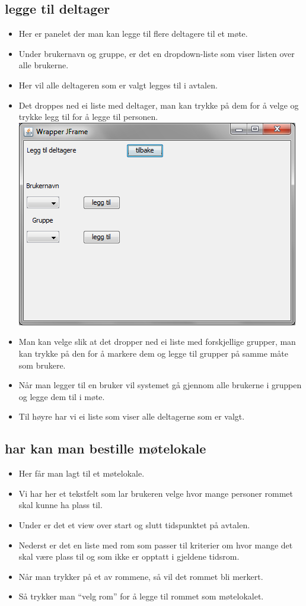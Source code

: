 \subsection{legge til deltager}
\begin{itemize}
\item Her er panelet der man kan legge til flere deltagere til et møte.
\item Under brukernavn og gruppe, er det en dropdown-liste som viser listen over alle brukerne.
\item Her vil alle deltageren som er valgt legges til i avtalen.
\item Det droppes ned ei liste med deltager, man kan trykke på dem for å velge og trykke legg til for å legge til personen.
\includegraphics[scale=0.5]{AddPersonPanel.png}
\item Man kan velge slik at det dropper ned ei liste med forskjellige grupper, man kan trykke på den for å markere dem og legge til grupper på samme måte som brukere.
\item Når man legger til en bruker vil systemet gå gjennom alle brukerne i gruppen og legge dem til i møte.
\item Til høyre har vi ei liste som viser alle deltagerne som er valgt.
\end{itemize}


\subsection{har kan man bestille møtelokale}
\begin{itemize}
\item Her får man lagt til et møtelokale.
\item Vi har her et tekstfelt som lar brukeren velge hvor mange personer rommet skal kunne ha plass til. 
\item Under er det et view over start og slutt tidspunktet på avtalen. 
\item Nederst er det en liste med rom som passer til kriterier om hvor mange det skal være plass til og som ikke er opptatt i gjeldene tidsrom.
\item Når man trykker på et av rommene, så vil det rommet bli merkert.
\item Så trykker man “velg rom” for å legge til rommet som møtelokalet.
\end{itemize}


